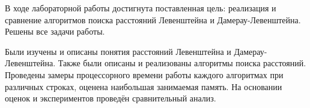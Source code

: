 В ходе лабораторной работы достигнута поставленная цель: реализация и сравнение алгоритмов поиска расстояний Левенштейна и Дамерау-Левенштейна. Решены все задачи работы.

Были изучены и описаны понятия расстояний Левенштейна и Дамерау-Левенштейна. Также были описаны и реализованы алгоритмы поиска расстояний. Проведены замеры процессорного времени работы каждого алгоритмах при различных строках, оценена наибольшая занимаемая память. На основании оценок и экспериментов проведён сравнительный анализ.
